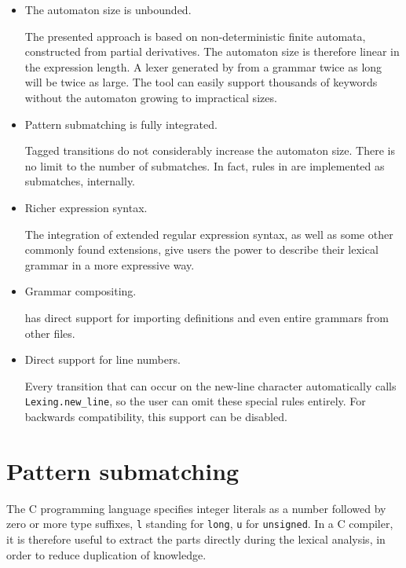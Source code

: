 \begin{itemize}

   \item The automaton size is unbounded.

      The presented approach is based on non-deterministic finite automata,
      constructed from partial derivatives. The automaton size is therefore
      linear in the expression length. A lexer generated by \dreml{} from a
      grammar twice as long will be twice as large. The tool can easily support
      thousands of keywords without the automaton growing to impractical sizes.

   \item Pattern submatching is fully integrated.

      Tagged transitions do not considerably increase the automaton size. There
      is no limit to the number of submatches. In fact, rules in \dreml{} are
      implemented as submatches, internally.

   \item Richer expression syntax.

      The integration of extended regular expression syntax, as well as some
      other commonly found extensions, give \dreml{} users the power to describe
      their lexical grammar in a more expressive way.

   \item Grammar compositing.

      \dreml{} has direct support for importing definitions and even entire
      grammars from other files.

   \item Direct support for line numbers.

      Every transition that can occur on the new-line character automatically
      calls \texttt{Lexing.new\_line}, so the user can omit these special rules
      entirely. For backwards compatibility, this support can be disabled.

\end{itemize}


\section{Pattern submatching}

The C programming language specifies integer literals as a number followed by
zero or more type suffixes, \texttt{l} standing for \texttt{long}, \texttt{u}
for \texttt{unsigned}. In a C compiler, it is therefore useful to extract the
parts directly during the lexical analysis, in order to reduce duplication of
knowledge.

